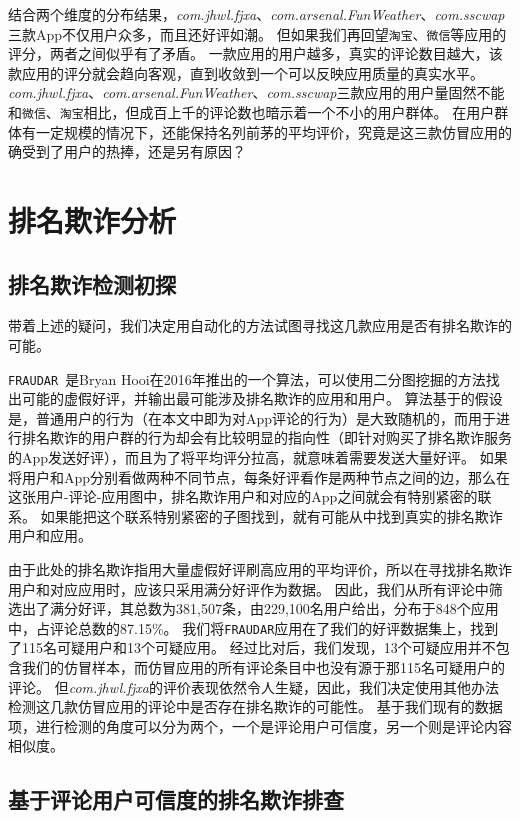 结合两个维度的分布结果，\emph{com.jhwl.fjxa}、\emph{com.arsenal.FunWeather}、\emph{com.sscwap}三款App不仅用户众多，而且还好评如潮。
但如果我们再回望\texttt{淘宝}、\texttt{微信}等应用的评分，两者之间似乎有了矛盾。
一款应用的用户越多，真实的评论数目越大，该款应用的评分就会趋向客观，直到收敛到一个可以反映应用质量的真实水平。
\emph{com.jhwl.fjxa}、\emph{com.arsenal.FunWeather}、\emph{com.sscwap}三款应用的用户量固然不能和\texttt{微信}、\texttt{淘宝}相比，但成百上千的评论数也暗示着一个不小的用户群体。
在用户群体有一定规模的情况下，还能保持名列前茅的平均评价，究竟是这三款仿冒应用的确受到了用户的热捧，还是另有原因？

\section{排名欺诈分析}

\subsection{排名欺诈检测初探}

带着上述的疑问，我们决定用自动化的方法试图寻找这几款应用是否有排名欺诈的可能。

\texttt{FRAUDAR}~\cite{hooi2016fraudar}是Bryan Hooi在2016年推出的一个算法，可以使用二分图挖掘的方法找出可能的虚假好评，并输出最可能涉及排名欺诈的应用和用户。
算法基于的假设是，普通用户的行为（在本文中即为对App评论的行为）是大致随机的，而用于进行排名欺诈的用户群的行为却会有比较明显的指向性（即针对购买了排名欺诈服务的App发送好评），而且为了将平均评分拉高，就意味着需要发送大量好评。
如果将用户和App分别看做两种不同节点，每条好评看作是两种节点之间的边，那么在这张用户-评论-应用图中，排名欺诈用户和对应的App之间就会有特别紧密的联系。
如果能把这个联系特别紧密的子图找到，就有可能从中找到真实的排名欺诈用户和应用。

由于此处的排名欺诈指用大量虚假好评刷高应用的平均评价，所以在寻找排名欺诈用户和对应应用时，应该只采用满分好评作为数据。
因此，我们从所有评论中筛选出了满分好评，其总数为381,507条，由229,100名用户给出，分布于848个应用中，占评论总数的87.15\%。
我们将\texttt{FRAUDAR}应用在了我们的好评数据集上，找到了115名可疑用户和13个可疑应用。
经过比对后，我们发现，13个可疑应用并不包含我们的仿冒样本，而仿冒应用的所有评论条目中也没有源于那115名可疑用户的评论。
但\emph{com.jhwl.fjxa}的评价表现依然令人生疑，因此，我们决定使用其他办法检测这几款仿冒应用的评论中是否存在排名欺诈的可能性。
基于我们现有的数据项，进行检测的角度可以分为两个，一个是评论用户可信度，另一个则是评论内容相似度。

\subsection{基于评论用户可信度的排名欺诈排查}

